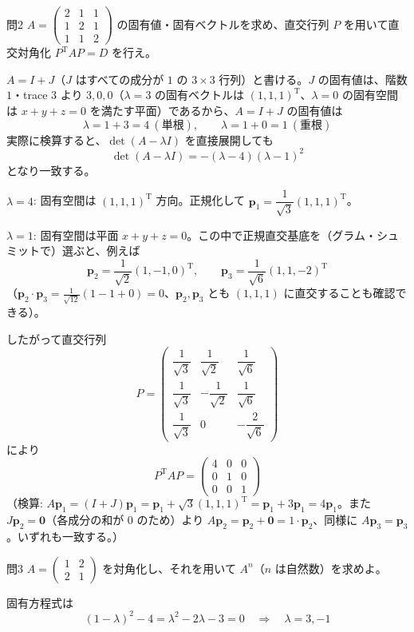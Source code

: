 \documentclass[a4paper,11pt]{article}
\begin{document}
\clearpage
\begin{mondaiboxS}{問2}
$A = \begin{pmatrix} 2 & 1 & 1 \\ 1 & 2 & 1 \\ 1 & 1 & 2 \end{pmatrix}$ の固有値・固有ベクトルを求め、直交行列 $P$ を用いて直交対角化 $P^{\mathrm{T}}AP = D$ を行え。
\end{mondaiboxS}
\kaitou
$A = I + J$（$J$ はすべての成分が $1$ の $3\times3$ 行列）と書ける。$J$ の固有値は、階数 $1$・trace $3$ より $3, 0, 0$（$\lambda=3$ の固有ベクトルは $(1,1,1)^{\mathrm{T}}$、$\lambda=0$ の固有空間は $x+y+z=0$ を満たす平面）であるから、$A = I+J$ の固有値は
\[
\lambda = 1+3 = 4 \ (\text{単根}), \qquad \lambda = 1+0 = 1 \ (\text{重根})
\]
実際に検算すると、$\det(A - \lambda I)$ を直接展開しても
\[
\det(A-\lambda I) = -(\lambda-4)(\lambda-1)^{2}
\]
となり一致する。

$\lambda = 4$: 固有空間は $(1,1,1)^{\mathrm{T}}$ 方向。正規化して $\bm{p}_1 = \dfrac{1}{\sqrt{3}}(1,1,1)^{\mathrm{T}}$。

$\lambda = 1$: 固有空間は平面 $x+y+z=0$。この中で正規直交基底を（グラム・シュミットで）選ぶと、例えば
\[
\bm{p}_2 = \frac{1}{\sqrt{2}}(1,-1,0)^{\mathrm{T}}, \qquad
\bm{p}_3 = \frac{1}{\sqrt{6}}(1,1,-2)^{\mathrm{T}}
\]
（$\bm{p}_2 \cdot \bm{p}_3 = \frac{1}{\sqrt{12}}(1-1+0)=0$、$\bm{p}_2, \bm{p}_3$ とも $(1,1,1)$ に直交することも確認できる）。

したがって直交行列
\[
P = \begin{pmatrix}
\dfrac{1}{\sqrt3} & \dfrac{1}{\sqrt2} & \dfrac{1}{\sqrt6} \\[6pt]
\dfrac{1}{\sqrt3} & -\dfrac{1}{\sqrt2} & \dfrac{1}{\sqrt6} \\[6pt]
\dfrac{1}{\sqrt3} & 0 & -\dfrac{2}{\sqrt6}
\end{pmatrix}
\]
により
\[
\boxed{\; P^{\mathrm{T}} A P = \begin{pmatrix} 4 & 0 & 0 \\ 0 & 1 & 0 \\ 0 & 0 & 1 \end{pmatrix} \;}
\]
（検算: $A\bm{p}_1 = (I+J)\bm{p}_1 = \bm{p}_1 + \sqrt3(1,1,1)^{\mathrm{T}} = \bm{p}_1 + 3\bm{p}_1 = 4\bm{p}_1$。また $J\bm{p}_2 = \bm{0}$（各成分の和が $0$ のため）より $A\bm{p}_2 = \bm{p}_2 + \bm{0} = 1\cdot\bm{p}_2$、同様に $A\bm{p}_3 = \bm{p}_3$。いずれも一致する。）

\clearpage
\begin{mondaiboxS}{問3}
$A = \begin{pmatrix} 1 & 2 \\ 2 & 1 \end{pmatrix}$ を対角化し、それを用いて $A^{n}$（$n$ は自然数）を求めよ。
\end{mondaiboxS}
\kaitou
固有方程式は
\[
(1-\lambda)^{2} - 4 = \lambda^{2} - 2\lambda - 3 = 0 \quad\Longrightarrow\quad \lambda = 3, -1
\]
\end{document}
